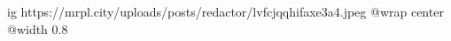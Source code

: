  
 
 
 
 

\ifcmt
  ig https://mrpl.city/uploads/posts/redactor/lvfcjqqhifaxe3a4.jpeg
  @wrap center
  @width 0.8
\fi
